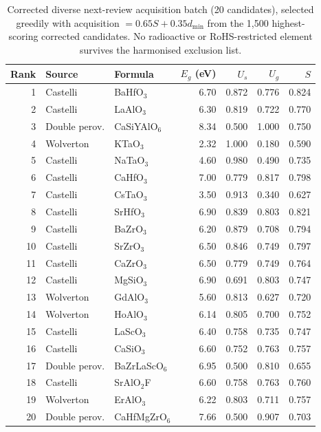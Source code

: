 \begin{table}[htbp]
\centering
\footnotesize
\setlength{\tabcolsep}{4pt}
\caption{Corrected diverse next-review acquisition batch (20 candidates), selected greedily with acquisition $=0.65S+0.35d_{\min}$ from the 1{,}500 highest-scoring corrected candidates. No radioactive or RoHS-restricted element survives the harmonised exclusion list.}
\label{tab:a1_corrected_acq}
\begin{tabular}{rllrrrr}
\toprule
Rank & Source & Formula & $E_g$ (eV) & $U_s$ & $U_g$ & $S$ \\
\midrule
1 & Castelli & BaHfO$_{3}$ & 6.70 & 0.872 & 0.776 & 0.824 \\
2 & Castelli & LaAlO$_{3}$ & 6.30 & 0.819 & 0.722 & 0.770 \\
3 & Double perov. & CaSiYAlO$_{6}$ & 8.34 & 0.500 & 1.000 & 0.750 \\
4 & Wolverton & KTaO$_{3}$ & 2.32 & 1.000 & 0.180 & 0.590 \\
5 & Castelli & NaTaO$_{3}$ & 4.60 & 0.980 & 0.490 & 0.735 \\
6 & Castelli & CaHfO$_{3}$ & 7.00 & 0.779 & 0.817 & 0.798 \\
7 & Castelli & CsTaO$_{3}$ & 3.50 & 0.913 & 0.340 & 0.627 \\
8 & Castelli & SrHfO$_{3}$ & 6.90 & 0.839 & 0.803 & 0.821 \\
9 & Castelli & BaZrO$_{3}$ & 6.20 & 0.879 & 0.708 & 0.794 \\
10 & Castelli & SrZrO$_{3}$ & 6.50 & 0.846 & 0.749 & 0.797 \\
11 & Castelli & CaZrO$_{3}$ & 6.50 & 0.779 & 0.749 & 0.764 \\
12 & Castelli & MgSiO$_{3}$ & 6.90 & 0.691 & 0.803 & 0.747 \\
13 & Wolverton & GdAlO$_{3}$ & 5.60 & 0.813 & 0.627 & 0.720 \\
14 & Wolverton & HoAlO$_{3}$ & 6.14 & 0.805 & 0.700 & 0.752 \\
15 & Castelli & LaScO$_{3}$ & 6.40 & 0.758 & 0.735 & 0.747 \\
16 & Castelli & CaSiO$_{3}$ & 6.60 & 0.752 & 0.763 & 0.757 \\
17 & Double perov. & BaZrLaScO$_{6}$ & 6.95 & 0.500 & 0.810 & 0.655 \\
18 & Castelli & SrAlO$_{2}$F & 6.60 & 0.758 & 0.763 & 0.760 \\
19 & Wolverton & ErAlO$_{3}$ & 6.22 & 0.803 & 0.711 & 0.757 \\
20 & Double perov. & CaHfMgZrO$_{6}$ & 7.66 & 0.500 & 0.907 & 0.703 \\
\bottomrule
\end{tabular}
\end{table}

